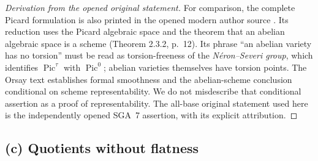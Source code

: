 \begin{proof}[Derivation from the opened original statement]
For comparison, the complete Picard formulation is also printed in the
opened modern author source \cite[Theorem 2.3.7, p.~15]{RobertAV2023}.
Its reduction uses the Picard algebraic space and the theorem that an
abelian algebraic space is a scheme (Theorem 2.3.2, p.~12). Its phrase
``an abelian variety has no torsion'' must be read as torsion-freeness of
the \emph{N\'eron--Severi group}, which identifies
$\operatorname{Pic}^{\tau}$ with $\operatorname{Pic}^0$; abelian varieties
themselves have torsion points. The Orsay text
\cite[IX, Theorem 2.1; XI, 3.5]{RaynaudOrsay1967} establishes formal
smoothness and the abelian-scheme conclusion conditional on scheme
representability. We do not misdescribe that conditional assertion as a
proof of representability. The all-base original statement used here is
the independently opened SGA~7 assertion, with its explicit attribution.
\end{proof}

\subsection{(c) Quotients without flatness}

